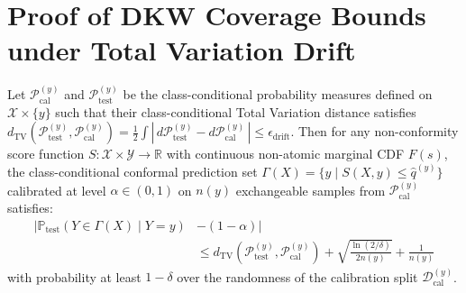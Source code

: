 \section{Proof of DKW Coverage Bounds under Total Variation Drift}
\label{app:proof_dkw}
\begin{theorem}
Let $\mathcal{P}_{\text{cal}}^{(y)}$ and $\mathcal{P}_{\text{test}}^{(y)}$ be the class-conditional probability measures defined on $\mathcal{X} \times \{y\}$ such that their class-conditional Total Variation distance satisfies $d_{\mathrm{TV}}(\mathcal{P}_{\text{test}}^{(y)}, \mathcal{P}_{\text{cal}}^{(y)}) = \frac{1}{2} \int |\, d\mathcal{P}_{\text{test}}^{(y)} - d\mathcal{P}_{\text{cal}}^{(y)} \,| \le \epsilon_{\text{drift}}$. Then for any non-conformity score function $S: \mathcal{X} \times \mathcal{Y} \to \mathbb{R}$ with continuous non-atomic marginal CDF $F(s)$, the class-conditional conformal prediction set $\Gamma(X) = \{y \mid S(X, y) \le \hat{q}^{(y)}\}$ calibrated at level $\alpha \in (0, 1)$ on $n(y)$ exchangeable samples from $\mathcal{P}_{\text{cal}}^{(y)}$ satisfies:
\begin{equation}
\begin{aligned}
\big| \mathbb{P}_{\text{test}}\left( Y \in \Gamma(X) \mid Y=y \right) & - (1 - \alpha) \big| \\
& \le d_{\mathrm{TV}}\left(\mathcal{P}_{\text{test}}^{(y)}, \mathcal{P}_{\text{cal}}^{(y)}\right) + \sqrt{\frac{\ln(2/\delta)}{2 n(y)}} + \frac{1}{n(y)}
\end{aligned}
\end{equation}
with probability at least $1 - \delta$ over the randomness of the calibration split $\mathcal{D}_{\text{cal}}^{(y)}$.
\end{theorem}


